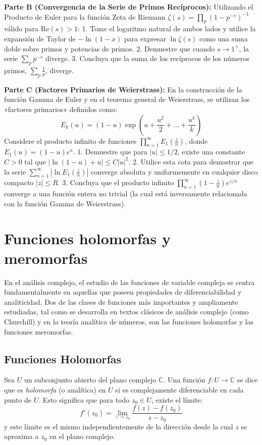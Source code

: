 \documentclass[a4paper]{article}
\begin{document}
\textbf{Parte B (Convergencia de la Serie de Primos Recíprocos):}
Utilizando el Producto de Euler para la función Zeta de Riemann $\zeta(s) = \prod_p (1 - p^{-s})^{-1}$ válido para $\text{Re}(s) > 1$:
1. Tome el logaritmo natural de ambos lados y utilice la expansión de Taylor de $-\ln(1-x)$ para expresar $\ln \zeta(s)$ como una suma doble sobre primos y potencias de primos.
2. Demuestre que cuando $s \to 1^+$, la serie $\sum_p p^{-s}$ diverge.
3. Concluya que la suma de los recíprocos de los números primos, $\sum_p \frac{1}{p}$, diverge.

\textbf{Parte C (Factores Primarios de Weierstrass):}
En la construcción de la función Gamma de Euler y en el teorema general de Weierstrass, se utilizan los «factores primarios» definidos como:
$$ E_k(u) = (1 - u) \exp\left( u + \frac{u^2}{2} + \dots + \frac{u^k}{k} \right) $$
Considere el producto infinito de funciones $\prod_{n=1}^{\infty} E_1\left(\frac{z}{n}\right)$, donde $E_1(u) = (1-u)e^u$.
1. Demuestre que para $|u| \leq 1/2$, existe una constante $C > 0$ tal que $|\ln(1-u) + u| \leq C|u|^2$.
2. Utilice esta cota para demostrar que la serie $\sum_{n=1}^{\infty} \left| \ln E_1\left(\frac{z}{n}\right) \right|$ converge absoluta y uniformemente en cualquier disco compacto $|z| \leq R$.
3. Concluya que el producto infinito $\prod_{n=1}^{\infty} \left(1 - \frac{z}{n}\right) e^{z/n}$ converge a una función entera no trivial (la cual está inversamente relacionada con la función Gamma de Weierstrass).

\section{Funciones holomorfas y meromorfas}

En el análisis complejo, el estudio de las funciones de variable compleja se centra fundamentalmente en aquellas que poseen propiedades de diferenciabilidad y analiticidad. Dos de las clases de funciones más importantes y ampliamente estudiadas, tal como se desarrolla en textos clásicos de análisis complejo (como Churchill) y en la teoría analítica de números, son las funciones holomorfas y las funciones meromorfas.

\subsection*{Funciones Holomorfas}
Sea $U$ un subconjunto abierto del plano complejo $\mathbb{C}$. Una función $f: U \to \mathbb{C}$ se dice que es \textit{holomorfa} (o analítica) en $U$ si es complejamente diferenciable en cada punto de $U$. Esto significa que para todo $z_0 \in U$, existe el límite:
$$ f'(z_0) = \lim_{z \to z_0} \frac{f(z) - f(z_0)}{z - z_0} $$
y este límite es el mismo independientemente de la dirección desde la cual $z$ se aproxima a $z_0$ en el plano complejo. 
\end{document}
